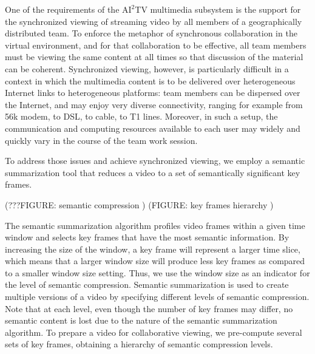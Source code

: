 \documentclass{sig-alternate}
\begin{document}

One of the requirements of the $\mathrm{AI}^2$TV multimedia subsystem
is the support for the synchronized viewing of streaming video by all
members of a geographically distributed team. To enforce the metaphor
of synchronous collaboration in the virtual environment, and for that
collaboration to be effective, all team members must be viewing the
same content at all times so that discussion of the material can be
coherent.  Synchronized viewing, however, is particularly difficult in
a context in which the multimedia content is to be delivered over
heterogeneous Internet links to heterogeneous platforms: team members
can be dispersed over the Internet, and may enjoy very diverse
connectivity, ranging for example from 56k modem, to DSL, to cable, to
T1 lines.  Moreover, in such a setup, the communication and computing
resources available to each user may widely and quickly vary in the
course of the team work session.

To address those issues and achieve synchronized viewing, we employ a
semantic summarization tool \cite{TIECHENG} that reduces a video to a
set of semantically significant key frames.

(???FIGURE: semantic compression )
(FIGURE: key frames hierarchy )

The semantic summarization algorithm profiles video frames within a
given time window and selects key frames that have the most semantic
information.  By increasing the size of the window, a key frame will
represent a larger time slice, which means that a larger window size
will produce less key frames as compared to a smaller window size
setting.  Thus, we use the window size as an indicator for the level
of semantic compression.  Semantic summarization is used to create
multiple versions of a video by specifying different levels of
semantic compression.  Note that at each level, even though the number
of key frames may differ, no semantic content is lost due to the
nature of the semantic summarization algorithm.  To prepare a video
for collaborative viewing, we pre-compute several sets of key frames,
obtaining a hierarchy of semantic compression levels.
\end{document}
